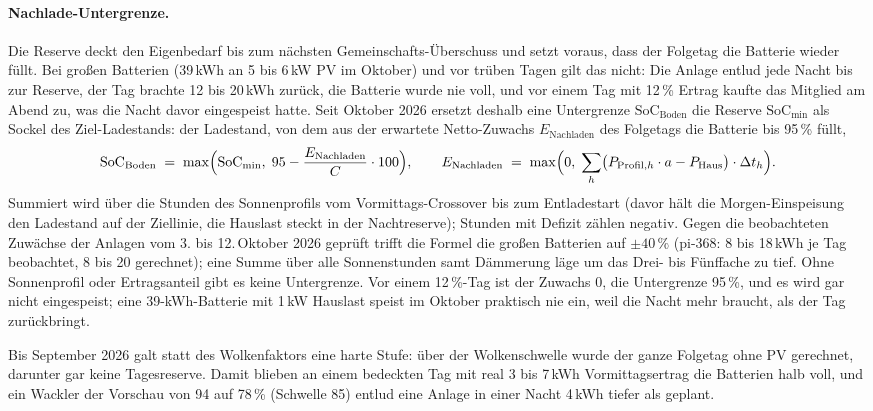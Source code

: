 \documentclass[11pt,a4paper]{article}
\begin{document}
\paragraph{Nachlade-Untergrenze.} Die Reserve deckt den Eigenbedarf bis
zum nächsten Gemeinschafts-Überschuss und setzt voraus, dass der Folgetag
die Batterie wieder füllt. Bei großen Batterien (39\,kWh an 5 bis 6\,kW
PV im Oktober) und vor trüben Tagen gilt das nicht: Die Anlage entlud jede
Nacht bis zur Reserve, der Tag brachte 12 bis 20\,kWh zurück, die Batterie
wurde nie voll, und vor einem Tag mit 12\,\% Ertrag kaufte das Mitglied am
Abend zu, was die Nacht davor eingespeist hatte. Seit Oktober 2026 ersetzt
deshalb eine Untergrenze $\text{SoC}_{\text{Boden}}$ die Reserve
$\text{SoC}_{\min}$ als Sockel des Ziel-Ladestands: der Ladestand, von dem
aus der erwartete Netto-Zuwachs $E_{\text{Nachladen}}$ des Folgetags die
Batterie bis 95\,\% füllt,
\begin{equation}
  \text{SoC}_{\text{Boden}} \;=\; \max\Bigl(\text{SoC}_{\min},\;
    95 - \frac{E_{\text{Nachladen}}}{C}\cdot 100\Bigr), \qquad
  E_{\text{Nachladen}} \;=\; \max\Bigl(0,\; \sum_{h}
    \bigl(P_{\text{Profil},h}\cdot a - P_{\text{Haus}}\bigr)\cdot \Delta t_h\Bigr).
  \label{eq:boden}
\end{equation}
Summiert wird über die Stunden des Sonnenprofils vom Vormittags-Crossover
bis zum Entladestart (davor hält die Morgen-Einspeisung den Ladestand auf
der Ziellinie, die Hauslast steckt in der Nachtreserve); Stunden mit
Defizit zählen negativ. Gegen die beobachteten Zuwächse der Anlagen vom
3. bis 12.\,Oktober 2026 geprüft trifft die Formel die großen Batterien auf
$\pm 40\,\%$ (pi-368: 8 bis 18\,kWh je Tag beobachtet, 8 bis 20 gerechnet);
eine Summe über alle Sonnenstunden samt Dämmerung läge um das Drei- bis
Fünffache zu tief. Ohne Sonnenprofil oder Ertragsanteil gibt es keine
Untergrenze. Vor einem 12\,\%-Tag ist der Zuwachs 0, die Untergrenze
95\,\%, und es wird gar nicht eingespeist; eine 39-kWh-Batterie mit 1\,kW
Hauslast speist im Oktober praktisch nie ein, weil die Nacht mehr braucht,
als der Tag zurückbringt.

Bis September 2026 galt statt des Wolkenfaktors eine harte Stufe: über
der Wolkenschwelle wurde der ganze Folgetag ohne PV gerechnet, darunter
gar keine Tagesreserve. Damit blieben an einem \glqq bedeckten\grqq{} Tag mit
real 3 bis 7\,kWh Vormittagsertrag die Batterien halb voll, und ein
Wackler der Vorschau von 94 auf 78\,\% (Schwelle 85) entlud eine Anlage in
einer Nacht 4\,kWh tiefer als geplant.
\end{document}
